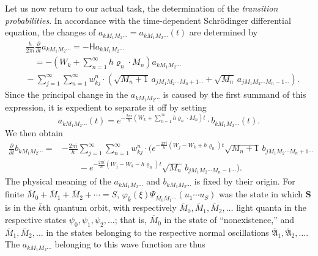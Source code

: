 \documentclass[fontsize=13pt,twoside,openany,headings=normal,parskip=false,bookmarkpackage=false,DIV=calc]{scrbook}
\begin{document}
Let us now return to our actual task, the determination of the \emph{transition probabilities}. In accordance with the time-dependent Schr\"odinger differential equation, the changes of $a_{kM_1M_2\cdots}=a_{kM_1M_2\cdots}(t)$ are determined by
\begin{align*}
 &\frac h{2\pi i}\frac\partial{\partial t}a_{kM_1M_2\cdots}=-\mathsf{H}a_{kM_1M_2\cdots}\\
 &\quad=-\left(W_k+\sum_{n=1}^{\infty}h\varrho_n\cdot M_n\right)a_{kM_1M_2\cdots}\\
 &{}-\sum_{j=1}^{\infty}\sum_{n=1}^{\infty}w_{kj}^n\cdot
 \left(\sqrt{M_n+1}\,a_{jM_1M_2\cdots M_n+1\cdots}
 +\sqrt{M_n}\,a_{jM_1M_2\cdots M_n-1\cdots}\right).
\end{align*}
\hypertarget{origpage-151}{}%
Since the principal change in the $a_{kM_1M_2\cdots}$ is caused by the first summand of this expression, it is expedient to separate it off by setting
\[
 a_{kM_1M_2\cdots}(t)=e^{-\frac{2\pi i}{h}(W_k+\sum_{n=1}^{\infty}h\varrho_n\cdot M_n)t}\cdot b_{kM_1M_2\cdots}(t).
\]
We then obtain
\begin{align*}
 \frac\partial{\partial t}b_{kM_1M_2\cdots}
 ={}&-\frac{2\pi i}{h}\sum_{j=1}^{\infty}\sum_{n=1}^{\infty}w_{kj}^n\cdot
 \bigl(e^{-\frac{2\pi i}{h}(W_j-W_k+h\varrho_n)t}\sqrt{M_n+1}\,b_{jM_1M_2\cdots M_n+1\cdots}\\
 &\qquad{}-e^{-\frac{2\pi i}{h}(W_j-W_k-h\varrho_n)t}\sqrt{M_n}\,b_{jM_1M_2\cdots M_n-1\cdots}\bigr).
\end{align*}
The physical meaning of the $a_{kM_1M_2\cdots}$ and $b_{kM_1M_2\cdots}$ is fixed by their origin. For finite $\overline M_0+\overline M_1+\overline M_2+\cdots=S$, $\varphi_{\bar k}(\xi)\Psi_{\overline M_0\overline M_1\cdots}(u_1\cdots u_S)$ was the state in which $\boldsymbol{S}$ is in the $\bar k$th quantum orbit, with respectively $\overline M_0,\overline M_1,\overline M_2,\ldots$ light quanta in the respective states $\psi_0,\psi_1,\psi_2,\ldots$; that is, $\overline M_0$ in the state of ``nonexistence,'' and $\overline M_1,\overline M_2,\ldots$ in the states belonging to the respective normal oscillations $\overline{\mathfrak A}_1,\overline{\mathfrak A}_2,\ldots$. The $a_{kM_1M_2\cdots}$ belonging to this wave function are thus
\end{document}
